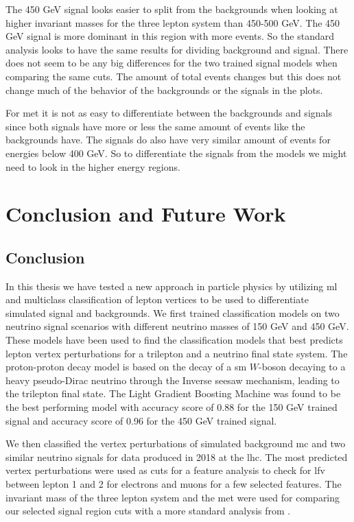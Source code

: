 \documentclass[a4paper, american, 12pt]{report}
\begin{document}
	The 450 GeV signal looks easier to split from the backgrounds when looking at higher invariant masses for the three lepton system than 450-500 GeV. The 450 GeV signal is more dominant in this region with more events. So the standard analysis looks to have the same results for dividing background and signal. There does not seem to be any big differences for the two trained signal models when comparing the same cuts. The amount of total events changes but this does not change much of the behavior of the backgrounds or the signals in the plots.
	
	For \acrshort{met} it is not as easy to differentiate between the backgrounds and signals since both signals have more or less the same amount of events like the backgrounds have. The signals do also have very similar amount of events for energies below 400 GeV. So to differentiate the signals from the models we might need to look in the higher energy regions.
	
	

	\chapter{Conclusion and Future Work}
	\label{chap:Conclusion}	
	
	\section{Conclusion}
	\label{sect:Conclusion-Conclusion}
	In this thesis we have tested a new approach in particle physics by utilizing \acrshort{ml} and multiclass classification of lepton vertices to be used to differentiate simulated signal and backgrounds. We first trained classification models on two neutrino signal scenarios with different neutrino masses of 150 GeV and 450 GeV. These models have been used to find the classification models that best predicts lepton vertex perturbations for a trilepton and a neutrino final state system. The proton-proton decay model is based on the decay of a \acrshort{sm} $W$-boson decaying to a heavy pseudo-Dirac neutrino through the Inverse seesaw mechanism, leading to the trilepton final state. The Light Gradient Boosting Machine was found to be the best performing model with accuracy score of 0.88 for the 150 GeV trained signal and accuracy score of 0.96 for the 450 GeV trained signal.
	
	We then classified the vertex perturbations of simulated background \acrshort{mc} and two similar neutrino signals for data produced in 2018 at the \acrshort{lhc}. The most predicted vertex perturbations were used as cuts for a feature analysis to check for \acrshort{lfv} between lepton 1 and 2 for electrons and muons for a few selected features. The invariant mass of the three lepton system and the \acrshort{met} were used for comparing our selected signal region cuts with a more standard analysis from \citet{inverseseesaw}. 
	
\end{document}
